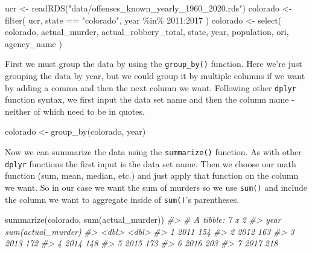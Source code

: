 \documentclass[
]{krantz}
\makeatletter
\newenvironment{Shaded}{\begin{snugshade}}{\end{snugshade}}
\newcommand{\CommentTok}[1]{\textcolor[rgb]{0.37,0.37,0.37}{\textit{#1}}}
\newcommand{\DecValTok}[1]{\textcolor[rgb]{0.06,0.06,0.06}{#1}}
\newcommand{\FunctionTok}[1]{\textcolor[rgb]{0,0,0}{#1}}
\newcommand{\NormalTok}[1]{#1}
\newcommand{\OtherTok}[1]{\textcolor[rgb]{0.37,0.37,0.37}{#1}}
\newcommand{\SpecialCharTok}[1]{\textcolor[rgb]{0,0,0}{#1}}
\newcommand{\StringTok}[1]{\textcolor[rgb]{0.5,0.5,0.5}{#1}}
\newenvironment{kframe}{%
\medskip{}
\setlength{\fboxsep}{.8em}
 \def\at@end@of@kframe{}%
 \ifinner\ifhmode%
  \def\at@end@of@kframe{\end{minipage}}%
  \begin{minipage}{\columnwidth}%
 \fi\fi%
 \def\FrameCommand##1{\hskip\@totalleftmargin \hskip-\fboxsep
 \colorbox{shadecolor}{##1}\hskip-\fboxsep
     \hskip-\linewidth \hskip-\@totalleftmargin \hskip\columnwidth}%
 \MakeFramed {\advance\hsize-\width
   \@totalleftmargin\z@ \linewidth\hsize
   \@setminipage}}%
 {\par\unskip\endMakeFramed%
 \at@end@of@kframe}
\renewenvironment{Shaded}{\begin{kframe}}{\end{kframe}}
\makeatother
\begin{document}
\begin{Shaded}
\begin{Highlighting}[]
\NormalTok{ucr }\OtherTok{\textless{}{-}} \FunctionTok{readRDS}\NormalTok{(}\StringTok{"data/offenses\_known\_yearly\_1960\_2020.rds"}\NormalTok{)}
\NormalTok{colorado }\OtherTok{\textless{}{-}} \FunctionTok{filter}\NormalTok{(}
\NormalTok{  ucr, state }\SpecialCharTok{==} \StringTok{"colorado"}\NormalTok{,}
\NormalTok{  year }\SpecialCharTok{\%in\%} \DecValTok{2011}\SpecialCharTok{:}\DecValTok{2017}
\NormalTok{)}
\NormalTok{colorado }\OtherTok{\textless{}{-}} \FunctionTok{select}\NormalTok{(}
\NormalTok{  colorado, actual\_murder, actual\_robbery\_total,}
\NormalTok{  state, year, population, ori, agency\_name}
\NormalTok{)}
\end{Highlighting}
\end{Shaded}

First we must group the data by using the
\texttt{group\_by()} function. Here we're just grouping the
data by year, but we could group it by multiple columns if
we want by adding a comma and then the next column we want.
Following other \texttt{dplyr} function syntax, we first
input the data set name and then the column name - neither
of which need to be in quotes.

\begin{Shaded}
\begin{Highlighting}[]
\NormalTok{colorado }\OtherTok{\textless{}{-}} \FunctionTok{group\_by}\NormalTok{(colorado, year)}
\end{Highlighting}
\end{Shaded}

Now we can summarize the data using the \texttt{summarize()}
function. As with other \texttt{dplyr} functions the first
input is the data set name. Then we choose our math function
(sum, mean, median, etc.) and just apply that function on
the column we want. So in our case we want the sum of
murders so we use \texttt{sum()} and include the column we
want to aggregate inside of \texttt{sum()}'s parentheses.

\begin{Shaded}
\begin{Highlighting}[]
\FunctionTok{summarize}\NormalTok{(colorado, }\FunctionTok{sum}\NormalTok{(actual\_murder))}
\CommentTok{\#\textgreater{} \# A tibble: 7 x 2}
\CommentTok{\#\textgreater{}    year \textasciigrave{}sum(actual\_murder)\textasciigrave{}}
\CommentTok{\#\textgreater{}   \textless{}dbl\textgreater{}                \textless{}dbl\textgreater{}}
\CommentTok{\#\textgreater{} 1  2011                  154}
\CommentTok{\#\textgreater{} 2  2012                  163}
\CommentTok{\#\textgreater{} 3  2013                  172}
\CommentTok{\#\textgreater{} 4  2014                  148}
\CommentTok{\#\textgreater{} 5  2015                  173}
\CommentTok{\#\textgreater{} 6  2016                  203}
\CommentTok{\#\textgreater{} 7  2017                  218}
\end{Highlighting}
\end{Shaded}
\end{document}
